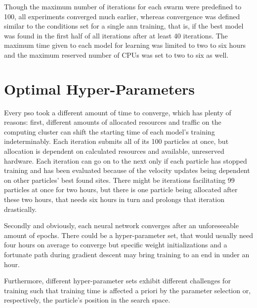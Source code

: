 Though the maximum number of iterations for each swarm were predefined to 100, all experiments converged much earlier, whereas convergence was defined similar to the conditions set for a single \gls{ann} training, that is, if the best model was found in the first half of all iterations after at least 40 iterations.
The maximum time given to each model for learning was limited to two to six hours and the maximum reserved number of CPUs was set to two to six as well.

\section{Optimal Hyper-Parameters}
Every \gls{pso} took a different amount of time to converge, which has plenty of reasons: 
first, different amounts of allocated resources and traffic on the computing cluster can shift the starting time of each model's training indeterminably.
Each iteration submits all of its 100 particles at once, but allocation is dependent on calculated resources and available, unreserved hardware.
Each iteration can go on to the next only if each particle has stopped training and has been evaluated because of the velocity updates being dependent on other particles' best found sites.
There might be iterations facilitating 99 particles at once for two hours, but there is one particle being allocated after these two hours, that needs six hours in turn and prolongs that iteration drastically.

Secondly and obviously, each neural network converges after an unforeseeable amount of epochs.
There could be a hyper-parameter set, that would usually need four hours on average to converge but specific weight initializations and a fortunate path during gradient descent may bring training to an end in under an hour.

Furthermore, different hyper-parameter sets exhibit different challenges for training such that training time is affected a priori by the parameter selection or, respectively, the particle's position in the search space.

